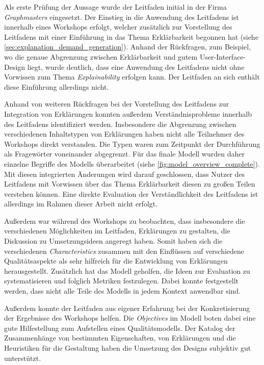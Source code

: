 \bigskip

Als erste Prüfung der Aussage wurde der Leitfaden initial in der Firma \textit{Graphmasters} eingesetzt. Der Einstieg in die Anwendung des Leitfadens ist innerhalb eines Workshops erfolgt, welcher zusätzlich zur Vorstellung des Leitfadens mit einer Einführung in das Thema Erklärbarkeit begonnen hat (siehe \autoref{sec:explanation_demand_generation}). Anhand der Rückfragen, zum Beispiel, wo die genaue Abgrenzung zwischen Erklärbarkeit und gutem User-Interface-Design liegt, wurde deutlich, dass eine Anwendung des Leitfadens nicht ohne Vorwissen zum Thema \textit{Explainability} erfolgen kann. Der Leitfaden an sich enthält diese Einführung allerdings nicht.

Anhand von weiteren Rückfragen bei der Vorstellung des Leitfadens zur Integration von Erklärungen konnten außerdem Verständnisprobleme innerhalb des Leitfadens identifiziert werden. Insbesondere die Abgrenzung zwischen verschiedenen Inhaltstypen von Erklärungen haben nicht alle Teilnehmer des Workshops direkt verstanden. Die Typen waren zum Zeitpunkt der Durchführung als Fragewörter voneinander abgegrenzt. Für das finale Modell wurden daher einzelne Begriffe des Modells überarbeitet (siehe \autoref{fig:model_overview_complete}). Mit diesen integrierten Änderungen wird darauf geschlossen, dass Nutzer des Leitfadens mit Vorwissen über das Thema Erklärbarkeit diesen zu großen Teilen verstehen können. Eine direkte Evaluation der Verständlichkeit des Leitfadens ist allerdings im Rahmen dieser Arbeit nicht erfolgt.

Außerdem war während des Workshops zu beobachten, dass insbesondere die verschiedenen Möglichkeiten im Leitfaden, Erklärungen zu gestalten, die Diskussion zu Umsetzungsideen angeregt haben. Somit haben sich die verschiedenen \textit{Characteristics} zusammen mit den Einflüssen auf verschiedene Qualitätsaspekte als sehr hilfreich für die Entwicklung von Erklärungen herausgestellt. Zusätzlich hat das Modell geholfen, die Ideen zur Evaluation zu systematisieren und folglich Metriken festzulegen. Dabei konnte festgestellt werden, dass nicht alle Teile des Modells in jedem Kontext anwendbar sind.

Außerdem konnte der Leitfaden aus eigener Erfahrung bei der Konkretisierung der Ergebnisse des Workshops helfen. Die \textit{Objectives} im Modell boten dabei eine gute Hilfestellung zum Aufstellen eines Qualitätsmodells. Der Katalog der Zusammenhänge von bestimmten Eigenschaften, von Erklärungen und die Heuristiken für die Gestaltung haben die Umsetzung des Designs subjektiv gut unterstützt.

